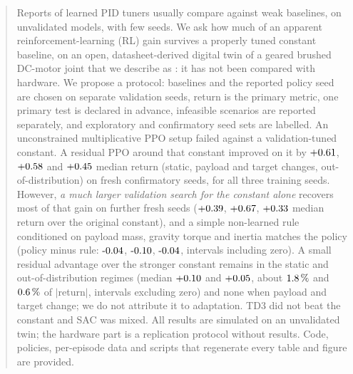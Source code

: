 \begin{abstract}
Reports of learned PID tuners usually compare against weak baselines, on unvalidated models, with few seeds. We ask how much of an apparent reinforcement-learning (RL) gain survives a properly tuned constant baseline, on an open, datasheet-derived digital twin of a geared brushed DC-motor joint that we describe as \prelim: it has not been compared with hardware.
We propose a protocol: baselines and the reported policy seed are chosen on separate validation seeds, return is the primary metric, one primary test is declared in advance, infeasible scenarios are reported separately, and exploratory and confirmatory seed sets are labelled.
An unconstrained multiplicative PPO setup failed against a validation-tuned constant. A residual PPO around that constant improved on it by $\ConfThreeStaticMed$, $\ConfThreeChangesMed$ and $\ConfThreeOodMed$ median return (static, payload and target changes, out-of-distribution) on fresh confirmatory seeds, for all three training seeds. However, \emph{a much larger validation search for the constant alone} recovers most of that gain on further fresh seeds ($\SensVThreeStaticBestConstantExtBestConstantMed$, $\SensVThreeChangesBestConstantExtBestConstantMed$, $\SensVThreeOodBestConstantExtBestConstantMed$ median return over the original constant), and a simple non-learned rule conditioned on payload mass, gravity torque and inertia matches the policy (policy minus rule: $\SensVThreeStaticPpoScenarioFitMed$, $\SensVThreeChangesPpoScenarioFitMed$, $\SensVThreeOodPpoScenarioFitMed$, intervals including zero). A small residual advantage over the stronger constant remains in the static and out-of-distribution regimes (median $\SensVThreeStaticPpoBestConstantExtMed$ and $\SensVThreeOodPpoBestConstantExtMed$, about $\SensVThreeStaticPpoExtPct\,\%$ and $\SensVThreeOodPpoExtPct\,\%$ of $|$return$|$, intervals excluding zero) and none when payload and target change; we do not attribute it to adaptation. TD3 did not beat the constant and SAC was mixed. All results are simulated on an unvalidated twin; the hardware part is a replication protocol without results. Code, policies, per-episode data and scripts that regenerate every table and figure are provided.
\end{abstract}
